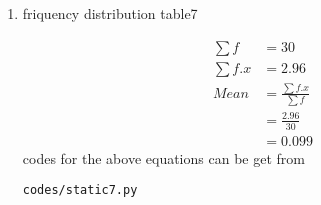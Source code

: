\renewcommand{\theequation}{\theenumi}
\begin{enumerate}[label=\arabic*.,ref=\thesubsection.\theenumi]
\item \begin{table}[!ht]
	\centering
	
	\caption{friquency distribution table7 }
\end{table}
\begin{align}
\sum{f} &= 30
\\
\sum{f.x} &= 2.96
\\
Mean &= \frac{\sum{f.x}}{\sum{f}}
\\ &= \frac{2.96}{30}
\\&= 0.099
\end{align}
codes for the above equations can be get from
\begin{lstlisting}
codes/static7.py
\end{lstlisting}
\end{enumerate}
